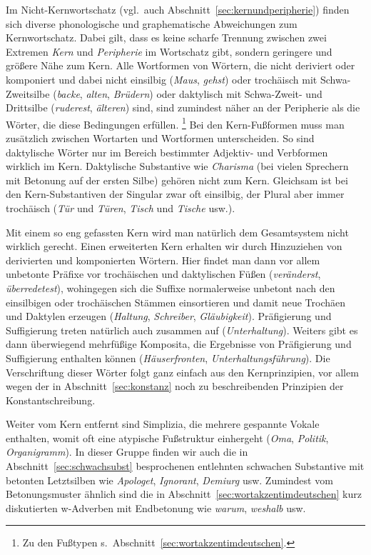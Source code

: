 \label{sec:nichtkernschreib}

Im Nicht-Kernwortschatz (vgl.\ auch Abschnitt~\ref{sec:kernundperipherie}) finden sich diverse phonologische und graphematische Abweichungen zum Kernwortschatz.
Dabei gilt, dass es keine scharfe Trennung zwischen zwei Extremen \textit{Kern} und \textit{Peripherie} im Wortschatz gibt, sondern geringere und größere Nähe zum Kern.
Alle Wortformen von Wörtern, die nicht deriviert oder komponiert und dabei nicht einsilbig (\textit{Maus}, \textit{gehst}) oder trochäisch mit Schwa-Zweitsilbe (\textit{backe}, \textit{alten}, \textit{Brüdern}) oder daktylisch mit Schwa-Zweit- und Drittsilbe (\textit{ruderest}, \textit{älteren}) sind, sind zumindest näher an der Peripherie als die Wörter, die diese Bedingungen erfüllen.%
\footnote{Zu den Fußtypen s.\ Abschnitt~\ref{sec:wortakzentimdeutschen}.}
Bei den Kern-Fußformen muss man zusätzlich zwischen Wortarten und Wortformen unterscheiden.
So sind \zB daktylische Wörter nur im Bereich bestimmter Adjektiv- und Verbformen wirklich im Kern.
Daktylische Substantive wie \textit{Charisma} \textipa{[ka.KIs.ma]} (bei vielen Sprechern mit Betonung auf der ersten Silbe) gehören nicht zum Kern.
Gleichsam ist bei den Kern-Substantiven der Singular zwar oft einsilbig, der Plural aber immer trochäisch (\textit{Tür} und \textit{Türen}, \textit{Tisch} und \textit{Tische} usw.).


Mit einem so eng gefassten Kern wird man natürlich dem Gesamtsystem nicht wirklich gerecht.
Einen erweiterten Kern erhalten wir durch Hinzuziehen von derivierten und komponierten Wörtern.
Hier findet man dann vor allem unbetonte Präfixe vor trochäischen und daktylischen Füßen (\textit{veränderst}, \textit{überredetest}), wohingegen sich die Suffixe normalerweise unbetont nach den einsilbigen oder trochäischen Stämmen einsortieren und damit neue Trochäen und Daktylen erzeugen (\textit{Haltung}, \textit{Schreiber}, \textit{Gläubigkeit}).
Präfigierung und Suffigierung treten natürlich auch zusammen auf (\textit{Unterhaltung}).
Weiters gibt es dann überwiegend mehrfüßige Komposita, die Ergebnisse von Präfigierung und Suffigierung enthalten können (\textit{Häuserfronten}, \textit{Unterhaltungsführung}).
Die Verschriftung dieser Wörter folgt ganz einfach aus den Kernprinzipien, vor allem wegen der in Abschnitt~\ref{sec:konstanz} noch zu beschreibenden Prinzipien der Konstantschreibung.

Weiter vom Kern entfernt sind Simplizia, die mehrere gespannte Vokale enthalten, womit oft eine atypische Fußstruktur einhergeht (\textit{Oma}, \textit{Politik}, \textit{Organigramm}).
In dieser Gruppe finden wir auch die in Abschnitt~\ref{sec:schwachsubst} besprochenen entlehnten schwachen Substantive mit betonten Letztsilben wie \textit{Apologet}, \textit{Ignorant}, \textit{Demiurg} usw.
Zumindest vom Betonungsmuster ähnlich sind die in Abschnitt~\ref{sec:wortakzentimdeutschen} kurz diskutierten w-Adverben mit Endbetonung wie \textit{warum}, \textit{weshalb} usw.

